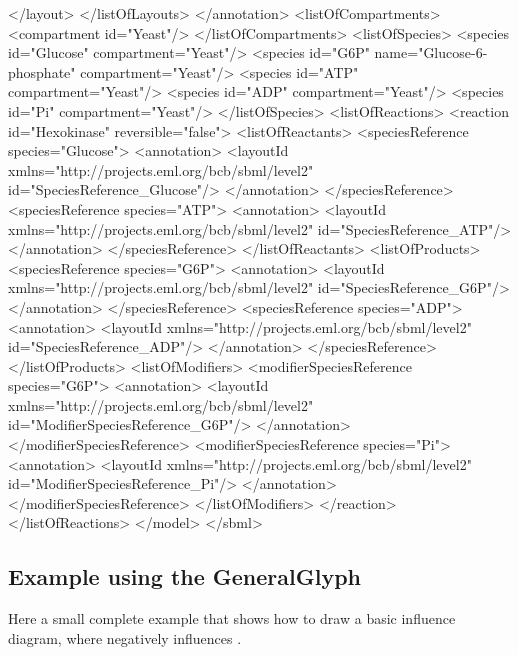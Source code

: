 \begin{example}
       </layout>
     </listOfLayouts>
    </annotation>
    <listOfCompartments>
      <compartment id="Yeast"/>
    </listOfCompartments>
    <listOfSpecies>
      <species id="Glucose" compartment="Yeast"/>
      <species id="G6P" name="Glucose-6-phosphate" compartment="Yeast"/>
      <species id="ATP" compartment="Yeast"/>
      <species id="ADP" compartment="Yeast"/>
      <species id="Pi" compartment="Yeast"/>
    </listOfSpecies>
    <listOfReactions>
      <reaction id="Hexokinase" reversible="false">
        <listOfReactants>
          <speciesReference species="Glucose">
            <annotation>
              <layoutId xmlns="http://projects.eml.org/bcb/sbml/level2"
                        id="SpeciesReference_Glucose"/>
            </annotation>
          </speciesReference>
          <speciesReference species="ATP">
            <annotation>
              <layoutId xmlns="http://projects.eml.org/bcb/sbml/level2" 
                        id="SpeciesReference_ATP"/>
            </annotation>
          </speciesReference>
        </listOfReactants>
        <listOfProducts>
          <speciesReference species="G6P">
            <annotation>
              <layoutId xmlns="http://projects.eml.org/bcb/sbml/level2" 
                        id="SpeciesReference_G6P"/>
            </annotation>
          </speciesReference>
          <speciesReference species="ADP">
            <annotation>
              <layoutId xmlns="http://projects.eml.org/bcb/sbml/level2"
                        id="SpeciesReference_ADP"/>
            </annotation>
          </speciesReference>
        </listOfProducts>
        <listOfModifiers>
          <modifierSpeciesReference species="G6P">
            <annotation>
              <layoutId xmlns="http://projects.eml.org/bcb/sbml/level2"
                        id="ModifierSpeciesReference_G6P"/>
            </annotation>
          </modifierSpeciesReference>
          <modifierSpeciesReference species="Pi">
            <annotation>
              <layoutId xmlns="http://projects.eml.org/bcb/sbml/level2" 
                        id="ModifierSpeciesReference_Pi"/>
            </annotation>
          </modifierSpeciesReference>
        </listOfModifiers>
      </reaction>
    </listOfReactions>
  </model>
</sbml>
\end{example}

\subsection{Example using the GeneralGlyph}
\label{example-generalglyph}
Here a small complete example that shows how to draw a basic influence
diagram, where  negatively influences . 


